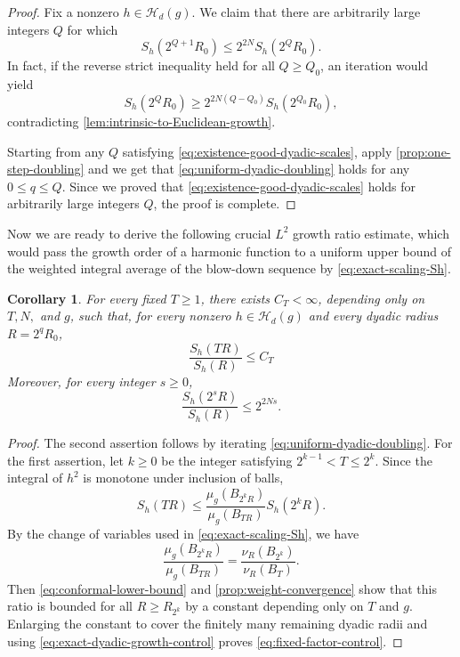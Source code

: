 \documentclass[12pt]{amsart}
\theoremstyle{plain}
\newtheorem{corollary}[theorem]{Corollary}
\theoremstyle{definition}
\theoremstyle{remark}     %
\numberwithin{equation}{section}
\begin{document}
\begin{proof}
Fix a nonzero $h\in\mathcal H_d(g)$. We claim that   there are arbitrarily large integers $Q$
for which
\begin{equation}\label{eq:existence-good-dyadic-scales}
    S_h(2^{Q+1}R_0)
    \leq2^{2N}S_h(2^QR_0).
\end{equation}
In fact, if the reverse strict inequality held for all $Q\geq Q_0$, an iteration would yield
\[
    S_h(2^QR_0)
    \geq 2^{2N(Q-Q_0)}S_h(2^{Q_0}R_0),
\]
contradicting \cref{lem:intrinsic-to-Euclidean-growth}.

Starting from any $Q$ satisfying
\cref{eq:existence-good-dyadic-scales}, apply
\cref{prop:one-step-doubling} and we get that \cref{eq:uniform-dyadic-doubling} holds for any $0\leq q\leq Q$. Since we proved that \cref{eq:existence-good-dyadic-scales} holds for arbitrarily large integers $Q$, the proof is complete.
\end{proof}
Now we are ready to derive the following crucial $L^2$ growth ratio estimate, which would pass the growth order of a harmonic function to a uniform upper bound of the weighted integral average of the blow-down sequence by \cref{eq:exact-scaling-Sh}.

\begin{corollary}
\label{cor:fixed-factor-control}
For every fixed $T\geq1$, there exists $C_T<\infty$, depending only on
$T,N,$ and $g$, such that,
for every nonzero $h\in\mathcal H_d(g)$ and every dyadic radius
$R=2^qR_0$,
\begin{equation}\label{eq:fixed-factor-control}
    \frac{S_h(TR)}{S_h(R)}\leq C_T
\end{equation}
  Moreover, for every integer $s\geq0$,
\begin{equation}\label{eq:exact-dyadic-growth-control}
    \frac{S_h(2^sR)}{S_h(R)}\leq2^{2Ns}.
\end{equation}
\end{corollary}

\begin{proof}
The second assertion follows by iterating
\cref{eq:uniform-dyadic-doubling}.  For the first assertion, let
 $k\geq0$ be the integer satisfying $2^{k-1}<T\leq2^k$.  Since the integral of
$h^2$ is monotone under inclusion of balls,
\[
    S_h(TR)
    \leq
    \frac{\mu_g(B_{2^kR})}{\mu_g(B_{TR})}
    S_h(2^kR).
\]
By the change of variables used in \cref{eq:exact-scaling-Sh}, we have
\[
    \frac{\mu_g(B_{2^kR})}{\mu_g(B_{TR})}
    =\frac{\nu_R(B_{2^k})}{\nu_R(B_T)}.
\]
Then \cref{eq:conformal-lower-bound} and \cref{prop:weight-convergence}  show that this ratio is bounded for all $R\geq R_{2^k}$ by a constant depending
only on $T$ and $g$.  Enlarging the constant to cover the finitely many
remaining dyadic radii and using
\cref{eq:exact-dyadic-growth-control} proves
\cref{eq:fixed-factor-control}.
\end{proof}
\end{document}
